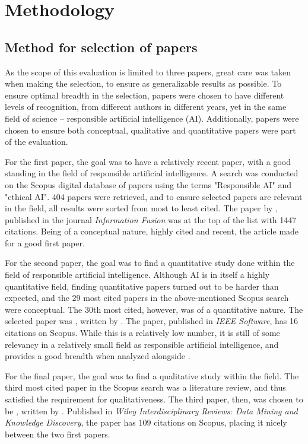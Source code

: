 \section{Methodology}

\subsection{Method for selection of papers}
\label{sec:paper-selection}
As the scope of this evaluation is limited to three papers, great care was taken when making the selection, to ensure as generalizable results as possible. To ensure optimal breadth in the selection, papers were chosen to have different levels of recognition, from different authors in different years, yet in the same field of science -- responsible artificial intelligence (AI). Additionally, papers were chosen to ensure both conceptual, qualitative and quantitative papers were part of the evaluation.

For the first paper, the goal was to have a relatively recent paper, with a good standing in the field of responsible artificial intelligence. A search was conducted on the Scopus digital database of papers using the terms "Responsible AI" and "ethical AI". 404 papers were retrieved, and to ensure selected papers are relevant in the field, all results were sorted from most to least cited. The paper  by \textcite{Barredo_2020}, published in the journal \textit{Information Fusion} was at the top of the list with 1447 citations. Being of a conceptual nature, highly cited and recent, the article made for a good first paper.

For the second paper, the goal was to find a quantitative study done within the field of responsible artificial intelligence. Although AI is in itself a highly quantitative field, finding quantitative papers turned out to be harder than expected, and the 29 most cited papers in the above-mentioned Scopus search were conceptual. The 30th most cited, however, was of a quantitative nature. The selected paper was , written by \textcite{Vakkuri_2020}. The paper, published in \textit{IEEE Software}, has 16 citations on Scopus. While this is a relatively low number, it is still of some relevancy in a relatively small field as responsible artificial intelligence, and provides a good breadth when analyzed alongside \textcite{Barredo_2020}.

For the final paper, the goal was to find a qualitative study within the field. The third most cited paper in the Scopus search was a literature review, and thus satisfied the requirement for qualitativeness. The third paper, then, was chosen to be , written by \textcite{Ntoutsi_2020}. Published in \textit{Wiley Interdisciplinary Reviews: Data Mining and Knowledge Discovery}, the paper has 109 citations on Scopus, placing it nicely between the two first papers.


